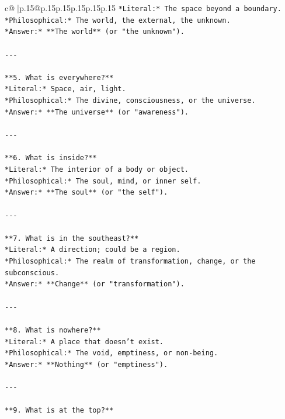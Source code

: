 \documentclass{article}
\begin{document}
{\begin{supertabular}{c@{$\;$}|p{.15\linewidth}@{}p{.15\linewidth}p{.15\linewidth}p{.15\linewidth}p{.15\linewidth}p{.15\linewidth}}
{{{\texttt{*Literal:* The space beyond a boundary.  } \\
\texttt{*Philosophical:* The world, the external, the unknown.  } \\
\texttt{*Answer:* **The world** (or "the unknown").} \\
\\ 
\texttt{{-}{-}{-}} \\
\\ 
\texttt{**5. What is everywhere?**  } \\
\texttt{*Literal:* Space, air, light.  } \\
\texttt{*Philosophical:* The divine, consciousness, or the universe.  } \\
\texttt{*Answer:* **The universe** (or "awareness").} \\
\\ 
\texttt{{-}{-}{-}} \\
\\ 
\texttt{**6. What is inside?**  } \\
\texttt{*Literal:* The interior of a body or object.  } \\
\texttt{*Philosophical:* The soul, mind, or inner self.  } \\
\texttt{*Answer:* **The soul** (or "the self").} \\
\\ 
\texttt{{-}{-}{-}} \\
\\ 
\texttt{**7. What is in the southeast?**  } \\
\texttt{*Literal:* A direction; could be a region.  } \\
\texttt{*Philosophical:* The realm of transformation, change, or the subconscious.  } \\
\texttt{*Answer:* **Change** (or "transformation").} \\
\\ 
\texttt{{-}{-}{-}} \\
\\ 
\texttt{**8. What is nowhere?**  } \\
\texttt{*Literal:* A place that doesn’t exist.  } \\
\texttt{*Philosophical:* The void, emptiness, or non{-}being.  } \\
\texttt{*Answer:* **Nothing** (or "emptiness").} \\
\\ 
\texttt{{-}{-}{-}} \\
\\ 
\texttt{**9. What is at the top?**  } \\
}}}
\end{supertabular}}
\end{document}
